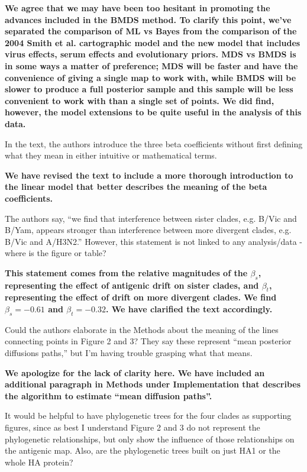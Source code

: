 \documentclass[11pt,oneside,letterpaper]{article}
\begin{document}
\textbf{We agree that we may have been too hesitant in promoting the advances included in the BMDS method.  To clarify this point, we've separated the comparison of ML vs Bayes from the comparison of the 2004 Smith et al. cartographic model and the new model that includes virus effects, serum effects and evolutionary priors.  MDS vs BMDS is in some ways a matter of preference; MDS will be faster and have the convenience of giving a single map to work with, while BMDS will be slower to produce a full posterior sample and this sample will be less convenient to work with than a single set of points.  We did find, however, the model extensions to be quite useful in the analysis of this data.}

In the text, the authors introduce the three beta coefficients without first defining what they mean in either intuitive or mathematical terms.

\textbf{We have revised the text to include a more thorough introduction to the linear model that better describes the meaning of the beta coefficients.}

The authors say, ``we find that interference between sister clades, e.g. B/Vic and B/Yam, appears stronger than interference between more divergent clades, e.g. B/Vic and A/H3N2.'' However, this statement is not linked to any analysis/data - where is the figure or table?

\textbf{This statement comes from the relative magnitudes of the $\beta_s$, representing the effect of antigenic drift on sister clades, and $\beta_t$, representing the effect of drift on more divergent clades.  We find $\beta_s = -0.61$ and $\beta_t = -0.32$.  We have clarified the text accordingly.}

Could the authors elaborate in the Methods about the meaning of the lines connecting points in Figure 2 and 3? They say these represent ``mean posterior diffusions paths,'' but I'm having trouble grasping what that means.

\textbf{We apologize for the lack of clarity here.  We have included an additional paragraph in Methods under Implementation that describes the algorithm to estimate ``mean diffusion paths''.}

It would be helpful to have phylogenetic trees for the four clades as supporting figures, since as best I understand Figure 2 and 3 do not represent the phylogenetic relationships, but only show the influence of those relationships on the antigenic map. Also, are the phylogenetic trees built on just HA1 or the whole HA protein?
\end{document}
